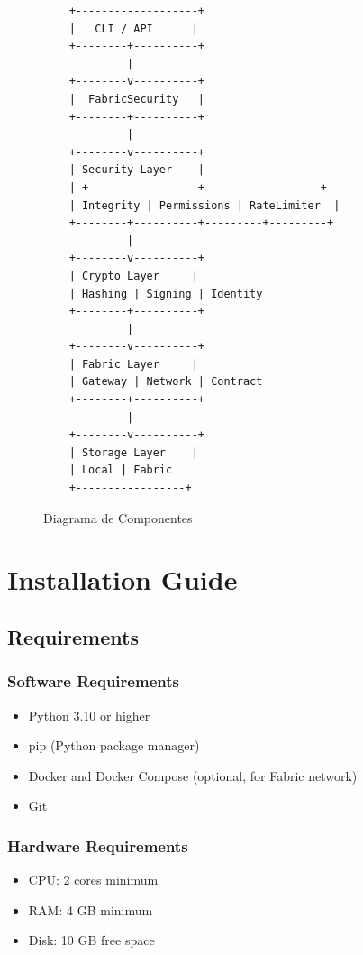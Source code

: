 \documentclass[12pt,a4paper]{report}
\begin{document}
\begin{figure}[H]
    \centering
    \begin{verbatim}
    +-------------------+
    |   CLI / API      |
    +--------+----------+
             |
    +--------v----------+
    |  FabricSecurity   |
    +--------+----------+
             |
    +--------v----------+
    | Security Layer    |
    | +-----------------+------------------+
    | Integrity | Permissions | RateLimiter  |
    +--------+----------+---------+---------+
             |
    +--------v----------+
    | Crypto Layer     |
    | Hashing | Signing | Identity
    +--------+----------+
             |
    +--------v----------+
    | Fabric Layer     |
    | Gateway | Network | Contract
    +--------+----------+
             |
    +--------v----------+
    | Storage Layer    |
    | Local | Fabric
    +-----------------+
    \end{verbatim}
    \caption{Diagrama de Componentes}
    \label{fig:components}
\end{figure}

\cleardoublepage

\chapter{Installation Guide}
\cleardoublepage

\section{Requirements}

\subsection{Software Requirements}

\begin{itemize}
    \item Python 3.10 or higher
    \item pip (Python package manager)
    \item Docker and Docker Compose (optional, for Fabric network)
    \item Git
\end{itemize}

\subsection{Hardware Requirements}

\begin{itemize}
    \item CPU: 2 cores minimum
    \item RAM: 4 GB minimum
    \item Disk: 10 GB free space
\end{itemize}
\end{document}
